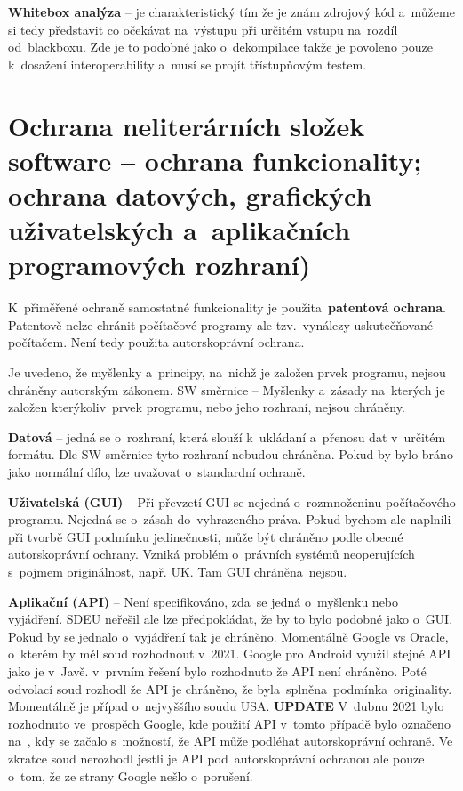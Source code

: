 \textbf{Whitebox analýza} -- je charakteristický tím že je znám zdrojový kód a~můžeme si tedy představit co očekávat na~výstupu při určitém vstupu na~rozdíl od~blackboxu. Zde je to podobné jako o~dekompilace takže je povoleno pouze k~dosažení interoperability a~musí se projít třístupňovým testem.










\clearpage
\section{Ochrana neliterárních složek software -- ochrana funkcionality; ochrana datových, grafických uživatelských a~aplikačních programových rozhraní)}

K~přiměřené ochraně samostatné funkcionality je použita~\textbf{patentová ochrana}. Patentově nelze chránit počítačové programy ale tzv.\ vynálezy uskutečňované počítačem. Není tedy použita autorskoprávní ochrana.

Je uvedeno, že myšlenky a~principy, na~nichž je založen prvek programu, nejsou chráněny autorským zákonem. SW směrnice -- Myšlenky a~zásady na~kterých je založen kterýkoliv~prvek programu, nebo jeho rozhraní, nejsou chráněny.

\textbf{Datová} -- jedná se o~rozhraní, která slouží k~ukládaní a~přenosu dat v~určitém formátu. Dle SW směrnice tyto rozhraní nebudou chráněna. Pokud by bylo bráno jako normální dílo, lze uvažovat o~standardní ochraně.

\textbf{Uživatelská (GUI)} -- Při převzetí GUI se nejedná o~rozmnoženinu počítačového programu. \textrightarrow Nejedná se o~zásah do~vyhrazeného práva. Pokud bychom ale naplnili při tvorbě GUI podmínku jedinečnosti, může být chráněno podle obecné autorskoprávní ochrany. Vzniká problém o~právních systémů neoperujících s~pojmem originálnost, např. UK. Tam GUI chráněna~nejsou.

\textbf{Aplikační (API)} -- Není specifikováno, zda~se jedná o~myšlenku nebo vyjádření. SDEU neřešil ale lze předpokládat, že by to bylo podobné jako o~GUI. Pokud by se jednalo o~vyjádření tak je chráněno. Momentálně Google vs Oracle, o~kterém by měl soud rozhodnout v~2021. Google pro Android využil stejné API jako je v~Javě. v~prvním řešení bylo rozhodnuto že API není chráněno. Poté odvolací soud rozhodl že API je chráněno, že byla~splněna~podmínka~originality. Momentálně je případ o~nejvyššího soudu USA. \textbf{UPDATE} V~dubnu 2021 bylo rozhodnuto ve~prospěch Google, kde použití API v~tomto případě bylo označeno na~, kdy se začalo s~možností, že API může podléhat autorskoprávní ochraně. Ve zkratce soud nerozhodl jestli je API pod~autorskoprávní ochranou ale pouze o~tom, že ze strany Google nešlo o~porušení. 




